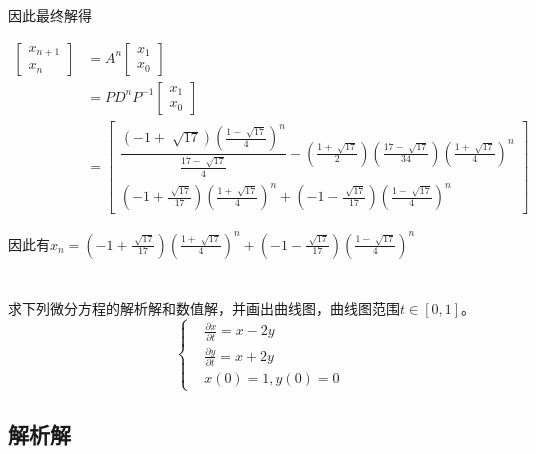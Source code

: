 因此最终解得

\begin{equation}
    \begin{aligned}
    \begin{bmatrix}
        x_{n+1} \\
        x_{n} 
    \end{bmatrix} &= 
    A^n
    \begin{bmatrix}
        x_{1} \\
        x_0
    \end{bmatrix}\\
     &= PD^nP^{-1}\begin{bmatrix}
        x_{1} \\
        x_0
    \end{bmatrix}\\
    &= \begin{bmatrix}
        \dfrac{(-1 + \sqrt[]{17})(\frac{1-\sqrt[]{17}}{4})^n}{\frac{17-\sqrt[]{17}}{4}} - (\frac{1+\sqrt[]{17}}{2})(\frac{17-\sqrt[]{17}}{34})(\frac{1+\sqrt[]{17}}{4})^n \\
        (-1+\frac{\sqrt[]{17}}{17})(\frac{1+\sqrt[]{17}}{4})^n+(-1-\frac{\sqrt[]{17}}{17})( \frac{1-\sqrt[]{17}}{4} )^n
    \end{bmatrix}
\end{aligned}
\end{equation}

因此有$x_n = (-1+\frac{\sqrt[]{17}}{17})(\frac{1+\sqrt[]{17}}{4})^n+(-1-\frac{\sqrt[]{17}}{17})( \frac{1-\sqrt[]{17}}{4} )^n$

\chapter{}


求下列微分方程的解析解和数值解，并画出曲线图，曲线图范围$t\in[0,1]$。
\begin{equation*}
    \left \{
        \begin{aligned}
            &\frac{\partial x}{\partial t} = x - 2y\\
            &\frac{\partial y}{\partial t} = x + 2y\\
            &x(0)=1, y(0) = 0
        \end{aligned}
    \right . 
\end{equation*}

\section{解析解}


